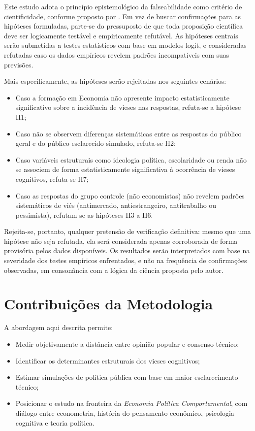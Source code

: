 Este estudo adota o princípio epistemológico da falseabilidade como critério de cientificidade, conforme proposto por . Em vez de buscar confirmações para as hipóteses formuladas, parte-se do pressuposto de que toda proposição científica deve ser logicamente testável e empiricamente refutável. As hipóteses centrais serão submetidas a testes estatísticos com base em modelos logit, e consideradas refutadas caso os dados empíricos revelem padrões incompatíveis com suas previsões.

Mais especificamente, as hipóteses serão rejeitadas nos seguintes cenários:

\begin{itemize}
    \item Caso a formação em Economia não apresente impacto estatisticamente significativo sobre a incidência de vieses nas respostas, refuta-se a hipótese H1;
    \item Caso não se observem diferenças sistemáticas entre as respostas do público geral e do público esclarecido simulado, refuta-se H2;
    \item Caso variáveis estruturais como ideologia política, escolaridade ou renda não se associem de forma estatisticamente significativa à ocorrência de vieses cognitivos, refuta-se H7;
    \item Caso as respostas do grupo controle (não economistas) não revelem padrões sistemáticos de viés (antimercado, antiestrangeiro, antitrabalho ou pessimista), refutam-se as hipóteses H3 a H6.
\end{itemize}

Rejeita-se, portanto, qualquer pretensão de verificação definitiva: mesmo que uma hipótese não seja refutada, ela será considerada apenas corroborada de forma provisória pelos dados disponíveis. Os resultados serão interpretados com base na severidade dos testes empíricos enfrentados, e não na frequência de confirmações observadas, em consonância com a lógica da ciência proposta pelo autor.


\section{Contribuições da Metodologia}

A abordagem aqui descrita permite:
\begin{itemize}
    \item Medir objetivamente a distância entre opinião popular e consenso técnico;
    \item Identificar os determinantes estruturais dos vieses cognitivos;
    \item Estimar simulações de política pública com base em maior esclarecimento técnico;
    \item Posicionar o estudo na fronteira da \textit{Economia Política Comportamental}, com diálogo entre econometria, história do pensamento econômico, psicologia cognitiva e teoria política.
\end{itemize}
